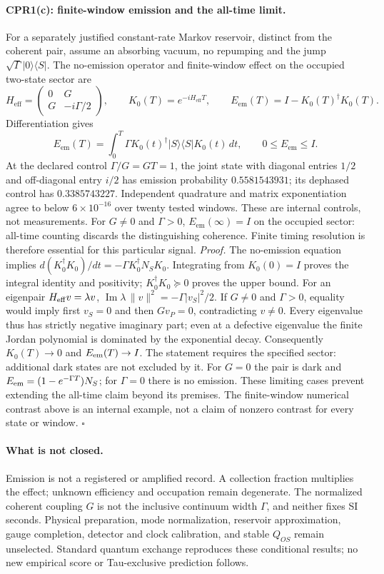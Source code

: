 \documentclass[11pt]{article}
\begin{document}
\paragraph{CPR1(c): finite-window emission and the all-time limit.}
For a separately justified constant-rate Markov reservoir, distinct from
the coherent pair, assume an absorbing vacuum, no repumping and the jump
$\sqrt{\Gamma}|0\rangle\langle S|$. The no-emission operator and
finite-window effect on the occupied two-state sector are
\[
 H_{\mathrm{eff}}=\begin{pmatrix}0&G\\G&-i\Gamma/2\end{pmatrix},
 \qquad K_0(T)=e^{-iH_{\mathrm{eff}}T},\qquad
 E_{\mathrm{em}}(T)=I-K_0(T)^\dagger K_0(T).
\]
Differentiation gives
\[
 E_{\mathrm{em}}(T)=\int_0^T\Gamma K_0(t)^\dagger
 |S\rangle\langle S|K_0(t)\,dt,\qquad 0\leq E_{\mathrm{em}}\leq I.
\]
At the declared control $\Gamma/G=GT=1$, the joint state with diagonal
entries $1/2$ and off-diagonal entry $i/2$ has emission probability
$0.5581543931$; its dephased control has $0.3385743227$. Independent
quadrature and matrix exponentiation agree to below $6\times10^{-16}$
over twenty tested windows. These are internal controls, not measurements.
For $G\ne0$ and $\Gamma>0$, $E_{\mathrm{em}}(\infty)=I$ on the occupied
sector: all-time counting discards the distinguishing coherence.
Finite timing resolution is therefore essential for this particular signal.
\emph{Proof.} The no-emission equation implies
$d(K_0^\dagger K_0)/dt=-\Gamma K_0^\dagger N_SK_0$.
Integrating from $K_0(0)=I$ proves the integral identity and positivity;
$K_0^\dagger K_0\succeq0$ proves the upper bound. For an eigenpair
$H_{\rm eff}v=\lambda v$,
$\operatorname{Im}\lambda\,\|v\|^2=-\Gamma|v_S|^2/2$.
If $G\ne0$ and $\Gamma>0$, equality would imply first $v_S=0$ and then
$Gv_P=0$, contradicting $v\ne0$. Every eigenvalue thus has strictly
negative imaginary part; even at a defective eigenvalue the finite
Jordan polynomial is dominated by the exponential decay. Consequently
$K_0(T)\to0$ and $E_{\rm em}(T)\to I$. The statement requires the
specified sector: additional dark states are not excluded by it.
For $G=0$ the pair is dark and
$E_{\rm em}=(1-e^{-\Gamma T})N_S$; for $\Gamma=0$ there is no emission.
These limiting cases prevent extending the all-time claim beyond its
premises. The finite-window numerical contrast above is an internal
example, not a claim of nonzero contrast for every state or window.
\hfill$\square$

\paragraph{What is not closed.}
Emission is not a registered or amplified record. A collection fraction
multiplies the effect; unknown efficiency and occupation remain degenerate.
The normalized coherent coupling $G$ is not the inclusive continuum width
$\Gamma$, and neither fixes SI seconds. Physical preparation, mode
normalization, reservoir approximation, gauge completion, detector and
clock calibration, and stable $Q_{OS}$ remain unselected. Standard quantum
exchange reproduces these conditional results; no new empirical score or
Tau-exclusive prediction follows.
\end{document}
